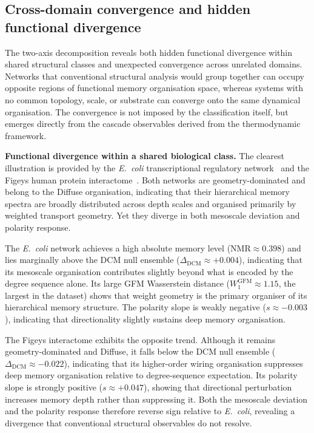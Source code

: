 \documentclass[aps,superscriptaddress,11pt]{revtex4-2}
\newcommand{\NMR}{\mathrm{NMR}}
\theoremstyle{definition}
\theoremstyle{plain}
\begin{document}
\subsection{Cross-domain convergence and hidden functional divergence}

The two-axis decomposition reveals both hidden functional divergence
within shared structural classes and unexpected convergence across
unrelated domains. Networks that conventional structural analysis would
group together can occupy opposite regions of functional memory organisation space,
whereas systems with no common topology, scale, or substrate can converge
onto the same dynamical organisation. The convergence is not imposed by
the classification itself, but emerges directly from the cascade
observables derived from the thermodynamic framework.

\medskip
\noindent\textbf{Functional divergence within a shared biological class.}
The clearest illustration is provided by the \textit{E.~coli}
transcriptional regulatory network~\cite{ShenOrr2002} and the Figeys human protein
interactome~\cite{Ewing2007}. Both networks are
geometry-dominated and belong to the Diffuse organisation, indicating that
their hierarchical memory spectra are broadly distributed across depth
scales and organised primarily by weighted transport geometry. Yet they diverge in both mesoscale 
deviation and polarity response.

The \textit{E.~coli} network achieves a high absolute memory level
($\NMR \approx 0.398$) and lies marginally above the DCM null ensemble
($\Delta_{\mathrm{DCM}} \approx +0.004$), indicating that its mesoscale
organisation contributes slightly beyond what is encoded by the degree sequence alone.
Its large GFM Wasserstein distance ($W_1^{\mathrm{GFM}} \approx 1.15$, the
largest in the dataset) shows that weight geometry is the primary
organiser of its hierarchical memory structure. The polarity slope is
weakly negative ($s\approx -0.003$), indicating that directionality slightly sustains 
deep memory organisation.

The Figeys interactome exhibits the opposite trend. Although it remains geometry-dominated 
and Diffuse, it falls below the DCM null ensemble ($\Delta_{\mathrm{DCM}} \approx -0.022$),
indicating that its higher-order wiring organisation suppresses deep memory organisation 
relative to degree-sequence expectation. Its polarity slope is
strongly positive ($s\approx +0.047$), showing that directional perturbation increases memory depth rather than
suppressing it. Both the mesoscale deviation and the polarity response
therefore reverse sign relative to \textit{E.~coli}, revealing a divergence that conventional 
structural observables do not resolve.
\end{document}
